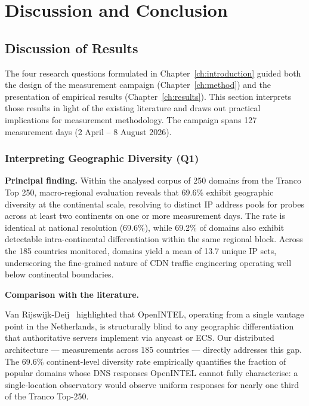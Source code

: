 \chapter{Discussion and Conclusion}
\label{ch:conclusion}

\section{Discussion of Results}
\label{sec:5.1}

The four research questions formulated in Chapter~\ref{ch:introduction} guided both the design of the measurement campaign (Chapter~\ref{ch:method}) and the presentation of empirical results (Chapter~\ref{ch:results}). This section interprets those results in light of the existing literature and draws out practical implications for measurement methodology. The campaign spans 127 measurement days (2 April -- 8 August 2026).

\bigskip
\subsection{Interpreting Geographic Diversity (Q1)}
\label{subsec:5.1.1}

\textbf{Principal finding.} Within the analysed corpus of 250 domains from the Tranco Top 250, macro-regional evaluation reveals that 69.6\% exhibit geographic diversity at the continental scale, resolving to distinct \ac{IP} address pools for probes across at least two continents on one or more measurement days. The rate is identical at national resolution (69.6\%), while 69.2\% of domains also exhibit detectable intra-continental differentiation within the same regional block. Across the 185 countries monitored, domains yield a mean of 13.7 unique \ac{IP} sets, underscoring the fine-grained nature of \ac{CDN} traffic engineering operating well below continental boundaries.

\textbf{Comparison with the literature.}

Van Rijswijk-Deij~\cite{vanRijswijk2016} highlighted that OpenINTEL, operating from a single vantage point in the Netherlands, is structurally blind to any geographic differentiation that authoritative servers implement via anycast or \ac{ECS}. Our distributed architecture --- measurements across 185 countries --- directly addresses this gap. The 69.6\% continent-level diversity rate empirically quantifies the fraction of popular domains whose \ac{DNS} responses OpenINTEL cannot fully characterise: a single-location observatory would observe uniform responses for nearly one third of the Tranco Top-250.

